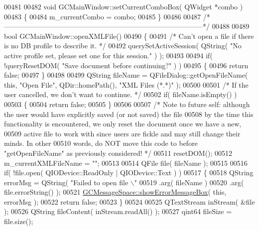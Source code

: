 \begin{DoxyCode}
{00481 
00482 \textcolor{keywordtype}{void} GCMainWindow::setCurrentComboBox( QWidget *combo )
00483 \{
00484   m\_currentCombo = combo;
00485 \}
00486 
00487 \textcolor{comment}{/*
      --------------------------------------------------------------------------------------*/}
00488 
00489 \textcolor{keywordtype}{bool} GCMainWindow::openXMLFile()
00490 \{
00491   \textcolor{comment}{/* Can't open a file if there is no DB profile to describe it. */}
00492   querySetActiveSession( QString( \textcolor{stringliteral}{"No active profile set, please set one for
       this session."} ) );
00493 
00494   \textcolor{keywordflow}{if}( !queryResetDOM( \textcolor{stringliteral}{"Save document before continuing?"} ) )
00495   \{
00496     \textcolor{keywordflow}{return} \textcolor{keyword}{false};
00497   \}
00498 
00499   QString fileName = QFileDialog::getOpenFileName( \textcolor{keyword}{this}, \textcolor{stringliteral}{"Open File"}, 
      QDir::homePath(), \textcolor{stringliteral}{"XML Files (*.*)"} );
00500 
00501   \textcolor{comment}{/* If the user cancelled, we don't want to continue. */}
00502   \textcolor{keywordflow}{if}( fileName.isEmpty() )
00503   \{
00504     \textcolor{keywordflow}{return} \textcolor{keyword}{false};
00505   \}
00506 
00507   \textcolor{comment}{/* Note to future self: although the user would have explicitly saved (or not
       saved) the file}
00508 \textcolor{comment}{    by the time this functionality is encountered, we only reset the document
       once we have a new,}
00509 \textcolor{comment}{    active file to work with since users are fickle and may still change their
       minds.  In other}
00510 \textcolor{comment}{    words, do NOT move this code to before "getOpenFileName" as previously
       considered! */}
00511   resetDOM();
00512   m\_currentXMLFileName = \textcolor{stringliteral}{""};
00513 
00514   QFile file( fileName );
00515 
00516   \textcolor{keywordflow}{if}( !file.open( QIODevice::ReadOnly | QIODevice::Text ) )
00517   \{
00518     QString errorMsg = QString( \textcolor{stringliteral}{"Failed to open file \(\backslash\)"%
00519                        .arg( fileName )
00520                        .arg( file.errorString() );
00521     \hyperlink{namespace_g_c_message_space_ab118b3a133686167617eb955029fd44e}{GCMessageSpace::showErrorMessageBox}( \textcolor{keyword}{this}, errorMsg );
00522     \textcolor{keywordflow}{return} \textcolor{keyword}{false};
00523   \}
00524 
00525   QTextStream inStream( &file );
00526   QString fileContent( inStream.readAll() );
00527   qint64 fileSize = file.size();
}}
\end{DoxyCode}
